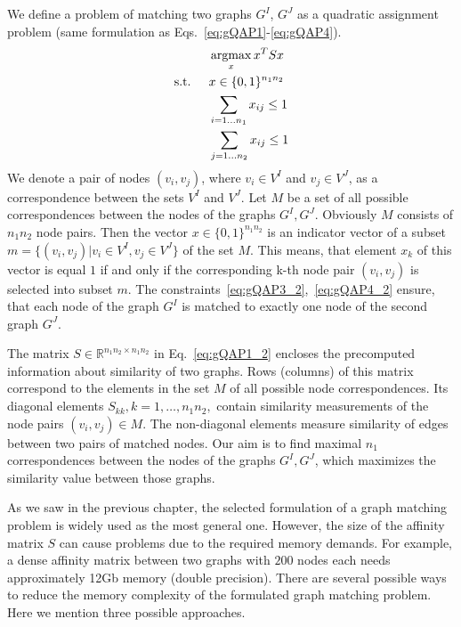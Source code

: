 We define a problem of matching two graphs $G^I$, $G^J$ as a quadratic assignment problem (same formulation as Eqs.~\eqref{eq:gQAP1}-\eqref{eq:gQAP4}). 
\begin{alignat}{2}
    &     && \mathop{\rm argmax}_x{x^TSx}                           \label{eq:gQAP1_2}\\
    & \text{s.t. } &&  x\in \{0,1\}^{n_1n_2}            \label{eq:gQAP2_2}\\
    &             &&  \sum_{i=1\dots n_1} x_{ij}\le 1   \label{eq:gQAP3_2}\\
    &             &&  \sum_{j=1\dots n_2} x_{ij}\le 1   \label{eq:gQAP4_2}
\end{alignat}
We denote a pair of nodes $(v_i,v_j)$, where $v_i\in V^I$ and $v_j\in V^J$, as a correspondence between the sets $V^I$ and $V^J$. Let $M$ be a set of all possible correspondences between the nodes of the graphs $G^I,G^J$. Obviously $M$ consists of $n_1n_2$ node pairs. Then the vector $x\in \{0,1\}^{n_1n_2}$ is an indicator vector of a subset $m=\{(v_i,v_j)|v_i\in V^I,v_j\in V^J\}$ of the set $M$. This means, that element $x_k$ of this vector is equal $1$ if and only if the corresponding k-th node pair $(v_i,v_j)$ is selected into subset $m$. The constraints~\eqref{eq:gQAP3_2},~\eqref{eq:gQAP4_2} ensure, that each node of the graph $G^I$ is matched to exactly one node of the second graph $G^J$.

The matrix $S\in\mathbb{R}^{n_1n_2\times n_1n_2}$ in Eq.~\eqref{eq:gQAP1_2} encloses the precomputed information about similarity of two graphs. Rows (columns) of this matrix correspond to the elements in the set $M$ of all possible node correspondences. Its diagonal elements $S_{kk},k=1,\dots,n_1n_2,$ contain similarity measurements of the node pairs $(v_i,v_j)\in M$. The non-diagonal elements measure similarity of edges between two pairs of matched nodes. Our aim is to find maximal $n_1$ correspondences between the nodes of the graphs $G^I,G^J$, which maximizes the similarity value between those graphs.

As we saw in the previous chapter, the selected formulation of a graph matching problem is widely used as the most general one. However, the size of the affinity matrix $S$ can cause problems due to the required memory demands. For example, a dense affinity matrix between two graphs with $200$ nodes each needs approximately 12Gb memory (double precision). There are several possible ways to reduce the memory complexity of the formulated graph matching problem. Here we mention three possible approaches.

